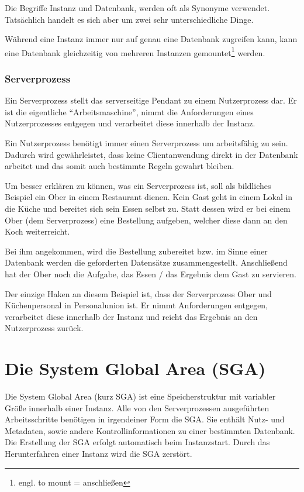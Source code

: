           \begin{merke}
            Die Begriffe Instanz und Datenbank, werden oft als Synonyme verwendet. Tatsächlich handelt es sich aber um zwei sehr unterschiedliche Dinge.
          \end{merke}
          Während eine Instanz immer nur auf genau eine Datenbank zugreifen kann, kann eine Datenbank gleichzeitig von mehreren Instanzen gemountet\footnote{engl. to mount = anschließen} werden.


        \subsubsection{Serverprozess}
          Ein Serverprozess stellt das serverseitige Pendant zu einem Nutzerprozess dar. Er ist die eigentliche \enquote{Arbeitsmaschine}, nimmt die Anforderungen eines Nutzerprozesses entgegen und verarbeitet diese innerhalb der Instanz.

          \begin{merke}
            Ein Nutzerprozess benötigt immer einen Serverprozess um arbeitsfähig zu sein. Dadurch wird gewährleistet, dass keine Clientanwendung direkt in der Datenbank arbeitet und das somit auch bestimmte Regeln gewahrt bleiben.
          \end{merke}

          Um besser erklären zu können, was ein Serverprozess ist, soll als bildliches Beispiel ein Ober in einem Restaurant dienen. Kein Gast geht in einem Lokal in die Küche und bereitet sich sein Essen selbst zu. Statt dessen wird er bei einem Ober (dem Serverprozess) eine Bestellung aufgeben, welcher diese dann an den Koch weiterreicht.

          Bei ihm  angekommen, wird die Bestellung zubereitet bzw. im Sinne einer Datenbank werden die geforderten Datensätze zusammengestellt. Anschließend hat der Ober noch die Aufgabe, das Essen / das Ergebnis dem Gast zu servieren.

          Der einzige Haken an diesem Beispiel ist, dass der Serverprozess Ober und Küchenpersonal in Personalunion ist. Er nimmt Anforderungen entgegen, verarbeitet diese innerhalb der Instanz und reicht das Ergebnis an den Nutzerprozess zurück.


     \section{Die System Global Area (SGA)}
        Die System Global Area (kurz SGA) ist eine Speicherstruktur mit variabler Größe innerhalb einer Instanz. Alle von den Serverprozessen ausgeführten Arbeitsschritte benötigen in irgendeiner Form die SGA. Sie enthält Nutz- und Metadaten, sowie andere Kontrollinformationen zu einer bestimmten Datenbank. Die Erstellung der SGA erfolgt automatisch beim Instanzstart. Durch das Herunterfahren einer Instanz wird die SGA zerstört.

